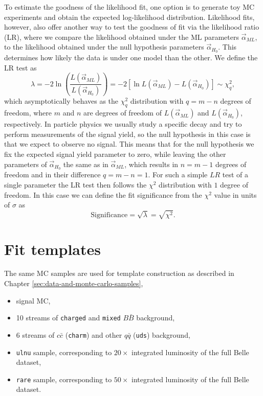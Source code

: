To estimate the goodness of the likelihood fit, one option is to generate toy MC experiments and obtain the expected log-likelihood distribution. Likelihood fits, however, also offer another way to test the goodness of fit via the likelihood ratio (LR), where we compare the likelihood obtained under the ML parameters $\vec\alpha_{ML}$, to the likelihood obtained under the null hypothesis parameters $\vec\alpha_{H_0}$. This determines how likely the data is under one model than the other. We define the LR test as
\begin{equation}
\label{eq:lr}
\lambda = -2\ln\left(\frac{L(\vec \alpha_{ML})}{L(\vec \alpha_{H_0})}\right) = -2 \left[ \ln L(\vec \alpha_{ML}) - L(\vec \alpha_{H_0})\right] \sim \chi^2_q,
\end{equation}
which asymptotically behaves as the $\chi^2_q$ distribution with $q=m-n$ degrees of freedom, where $m$ and $n$ are degrees of freedom of $L(\vec \alpha_{ML})$ and $L(\vec \alpha_{H_0})$, respectively. In particle physics we usually study a specific decay and try to perform measurements of the signal yield, so the null hypothesis in this case is that we expect to observe no signal. This means that for the null hypothesis we fix the expected signal yield parameter to zero, while leaving the other parameters of $\vec\alpha_{H_0}$ the same as in $\vec\alpha_{ML}$, which results in $n = m-1$ degrees of freedom and in their difference $q = m -n = 1$. For such a simple $LR$ test of a single parameter the LR test then follows the $\chi^2$ distribution with $1$ degree of freedom. In this case we can define the fit significance from the $\chi^2$ value in units of $\sigma$ as
\begin{equation}
\mathrm{Significance} = \sqrt{\lambda} = \sqrt{\chi^2}.
\end{equation}

\section{Fit templates}

The same MC samples are used for template construction as described in Chapter \ref{sec:data-and-monte-carlo-samples},
\begin{itemize}
\item signal MC,
\item 10 streams of \texttt{charged} and \texttt{mixed} $B \bar B$ background,
\item 6 streams of $c \bar c$ (\texttt{charm}) and other $q \bar q$ (\texttt{uds}) background,
\item \texttt{ulnu} sample, corresponding to $20\times$ integrated luminosity of the full Belle dataset,
\item \texttt{rare} sample, corresponding to $50\times$ integrated luminosity of the full Belle dataset.
\end{itemize}

